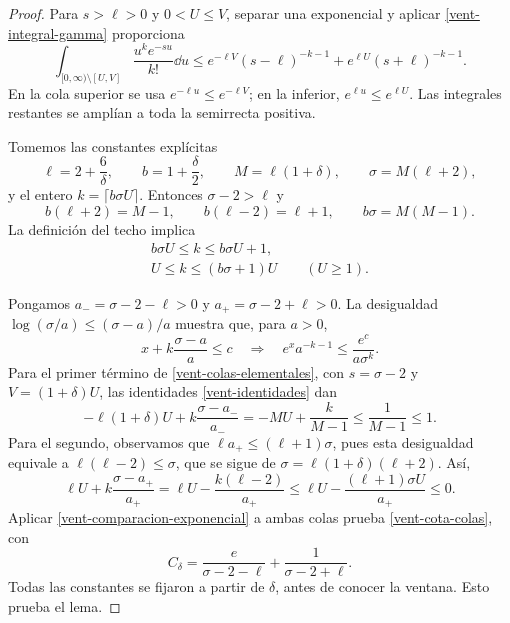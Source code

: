 \begin{proof}
Para $s>\ell>0$ y $0<U\le V$, separar una exponencial y aplicar
\eqref{vent-integral-gamma} proporciona
\begin{equation}
 \int_{[0,\infty)\setminus[U,V]}
 \frac{u^ke^{-su}}{k!}\dd u
 \le e^{-\ell V}(s-\ell)^{-k-1}
       +e^{\ell U}(s+\ell)^{-k-1}.
 \label{vent-colas-elementales}
\end{equation}
En la cola superior se usa $e^{-\ell u}\le e^{-\ell V}$; en la inferior,
$e^{\ell u}\le e^{\ell U}$. Las integrales restantes se amplían a toda
la semirrecta positiva.

Tomemos las constantes explícitas
\[
 \ell=2+\frac6\delta,\qquad b=1+\frac\delta2,\qquad
 M=\ell(1+\delta),\qquad \sigma=M(\ell+2),
\]
y el entero $k=\lceil b\sigma U\rceil$. Entonces $\sigma-2>\ell$ y
\begin{equation}
 b(\ell+2)=M-1,\qquad b(\ell-2)=\ell+1,\qquad
 b\sigma=M(M-1).
 \label{vent-identidades}
\end{equation}
La definición del techo implica
\begin{equation}
 \begin{gathered}
 b\sigma U\le k\le b\sigma U+1,\\
 U\le k\le(b\sigma+1)U\qquad(U\ge1).
 \end{gathered}
 \label{vent-orden-k}
\end{equation}

Pongamos $a_-=\sigma-2-\ell>0$ y $a_+=\sigma-2+\ell>0$.
La desigualdad $\log(\sigma/a)\le(\sigma-a)/a$ muestra que, para $a>0$,
\begin{equation}
 x+k\frac{\sigma-a}{a}\le c
 \quad\Longrightarrow\quad
 e^xa^{-k-1}\le\frac{e^c}{a\sigma^k}.
 \label{vent-comparacion-exponencial}
\end{equation}
Para el primer término de \eqref{vent-colas-elementales}, con
$s=\sigma-2$ y $V=(1+\delta)U$, las identidades
\eqref{vent-identidades} dan
\[
 -\ell(1+\delta)U+k\frac{\sigma-a_-}{a_-}
 =-MU+\frac{k}{M-1}\le\frac1{M-1}\le1.
\]
Para el segundo, observamos que $\ell a_+\le(\ell+1)\sigma$, pues esta
desigualdad equivale a $\ell(\ell-2)\le\sigma$, que se sigue de
$\sigma=\ell(1+\delta)(\ell+2)$. Así,
\[
 \ell U+k\frac{\sigma-a_+}{a_+}
 =\ell U-\frac{k(\ell-2)}{a_+}
 \le\ell U-\frac{(\ell+1)\sigma U}{a_+}\le0.
\]
Aplicar \eqref{vent-comparacion-exponencial} a ambas colas prueba
\eqref{vent-cota-colas}, con
\begin{equation}
 C_\delta=\frac e{\sigma-2-\ell}+\frac1{\sigma-2+\ell}.
 \label{vent-constante-colas}
\end{equation}
Todas las constantes se fijaron a partir de $\delta$, antes de conocer
la ventana. Esto prueba el lema.
\end{proof}

